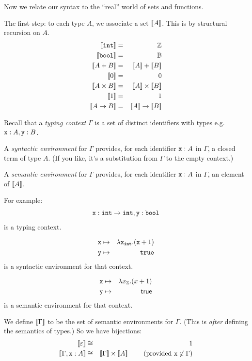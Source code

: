 \documentclass[runningheads,12pt]{llncs}
\begin{document}
Now we relate our syntax to the ``real'' world of sets and functions.

The first step: to each type $A$, we associate a set $[\![ {A} ]\!]$.  This is by structural recursion on $A$.
\begin{eqnarray*}
  \seman{\ttint} & = & \integ \\
  \seman{\ttbool} & = & \bool \\
  \seman{A+B} & = & \seman{A} + \seman{B} \\
 \seman{0} & = & 0 \\
\seman{A \times B} & = &  \seman{A} \times \seman{B} \\
\seman{1} & = & 1 \\
  \seman{A\rightarrow B} & = & \seman{A} \rightarrow \seman{B} 
\end{eqnarray*}

Recall that a \emph{typing context} $\Gamma$ is a set of distinct identifiers with types e.g.\ $\mathtt{x}:A, \mathtt{y}:B$.

A \emph{syntactic environment} for $\Gamma$ provides, for each identifier $\mathtt{x}:A$ in $\Gamma$, a closed term of type $A$.   (If you like, it's a substitution from $\Gamma$ to the empty context.)

A \emph{semantic environment} for $\Gamma$ provides, for each identifier $\mathtt{x}:A$ in $\Gamma$, an element of $[\![ {A} ]\!]$.

For example:
\begin{displaymath}
  \mathtt{x}: \mathtt{int} \rightarrow \mathtt{int}, \mathtt{y}:\mathtt{bool}
\end{displaymath}
is a typing context.

\begin{eqnarray*}
  \mathtt{x} & \mapsto & \lambda \mathtt{x}_{\mathtt{int}}. (\mathtt{x} + 1) \\
 \mathtt{y} & \mapsto & \mathtt{true}
\end{eqnarray*}
is a syntactic environment for that context.

\begin{eqnarray*}
  \mathtt{x} & \mapsto & \lambda x_{\mathbb{Z}}. (x + 1) \\
 \mathtt{y} & \mapsto & \mathsf{true}
\end{eqnarray*}
is a semantic environment for that context.


We define $[\![ {\Gamma} ]\!]$ to be the set of semantic environments for $\Gamma$.  (This is \emph{after} defining the semantics of types.)  So we have bijections:
\begin{eqnarray*}
  \seman{\varepsilon} & \cong & 1 \\
  \seman{\Gamma,\ttx:A} & \cong & \seman{\Gamma} \times \seman{A} \betwixt \betwixt \mbox{ (provided $\ttx \not \in \Gamma$)}
\end{eqnarray*}
\end{document}
